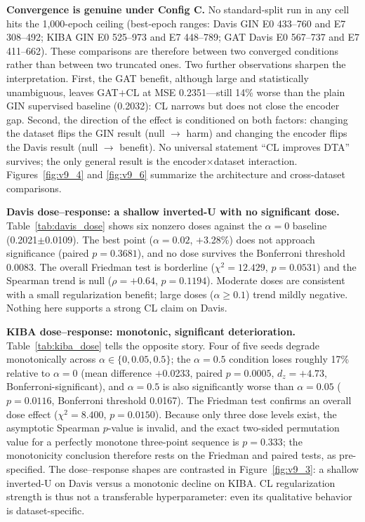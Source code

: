 \documentclass[10pt,a4paper,twocolumn]{article}
\begin{document}
\textbf{Convergence is genuine under Config C.} No standard-split run in any cell hits the 1{,}000-epoch ceiling (best-epoch ranges: Davis GIN E0 433--760 and E7 308--492; KIBA GIN E0 525--973 and E7 448--789; GAT Davis E0 567--737 and E7 411--662). These comparisons are therefore between two converged conditions rather than between two truncated ones. Two further observations sharpen the interpretation. First, the GAT benefit, although large and statistically unambiguous, leaves GAT$+$CL at MSE 0.2351---still 14\% worse than the plain GIN supervised baseline (0.2032): CL narrows but does not close the encoder gap. Second, the direction of the effect is conditioned on both factors: changing the dataset flips the GIN result (null $\to$ harm) and changing the encoder flips the Davis result (null $\to$ benefit). No universal statement ``CL improves DTA'' survives; the only general result is the encoder$\times$dataset interaction. Figures~\ref{fig:v9_4} and \ref{fig:v9_6} summarize the architecture and cross-dataset comparisons.

\textbf{Davis dose--response: a shallow inverted-U with no significant dose.} Table~\ref{tab:davis_dose} shows six nonzero doses against the $\alpha=0$ baseline (0.2021$\pm$0.0109). The best point ($\alpha=0.02$, $+$3.28\%) does not approach significance (paired $p=0.3681$), and no dose survives the Bonferroni threshold 0.0083. The overall Friedman test is borderline ($\chi^2=12.429$, $p=0.0531$) and the Spearman trend is null ($\rho=+0.64$, $p=0.1194$). Moderate doses are consistent with a small regularization benefit; large doses ($\alpha\geq0.1$) trend mildly negative. Nothing here supports a strong CL claim on Davis.

\textbf{KIBA dose--response: monotonic, significant deterioration.} Table~\ref{tab:kiba_dose} tells the opposite story. Four of five seeds degrade monotonically across $\alpha\in\{0, 0.05, 0.5\}$; the $\alpha=0.5$ condition loses roughly 17\% relative to $\alpha=0$ (mean difference $+$0.0233, paired $p=0.0005$, $d_z=+4.73$, Bonferroni-significant), and $\alpha=0.5$ is also significantly worse than $\alpha=0.05$ ($p=0.0116$, Bonferroni threshold 0.0167). The Friedman test confirms an overall dose effect ($\chi^2=8.400$, $p=0.0150$). Because only three dose levels exist, the asymptotic Spearman $p$-value is invalid, and the exact two-sided permutation value for a perfectly monotone three-point sequence is $p=0.333$; the monotonicity conclusion therefore rests on the Friedman and paired tests, as pre-specified. The dose--response shapes are contrasted in Figure~\ref{fig:v9_3}: a shallow inverted-U on Davis versus a monotonic decline on KIBA. CL regularization strength is thus not a transferable hyperparameter: even its qualitative behavior is dataset-specific.
\end{document}
